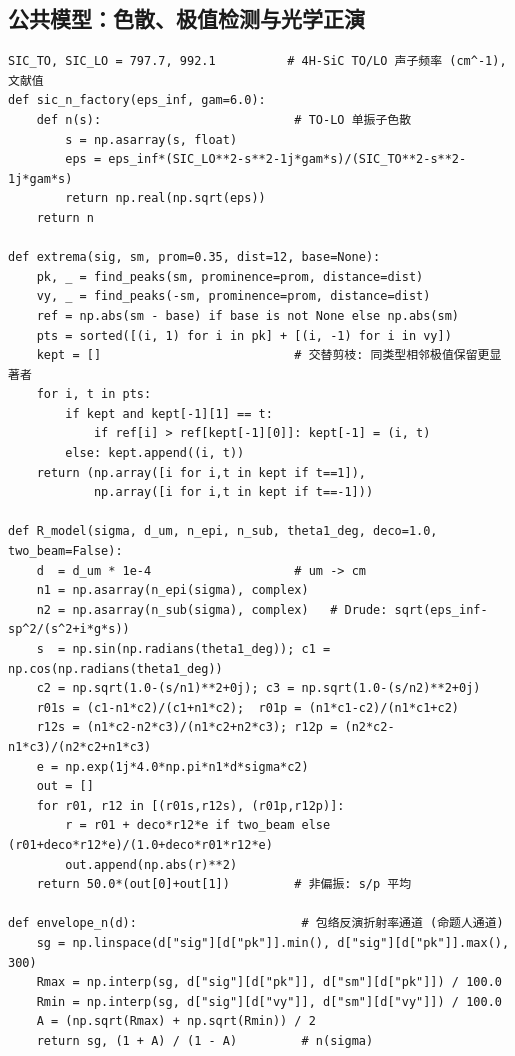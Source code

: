 \documentclass[11pt,a4paper,fontset=fandol]{ctexart}
\begin{document}
\subsection{公共模型：色散、极值检测与光学正演}
\begin{lstlisting}
SIC_TO, SIC_LO = 797.7, 992.1          # 4H-SiC TO/LO 声子频率 (cm^-1), 文献值
def sic_n_factory(eps_inf, gam=6.0):
    def n(s):                           # TO-LO 单振子色散
        s = np.asarray(s, float)
        eps = eps_inf*(SIC_LO**2-s**2-1j*gam*s)/(SIC_TO**2-s**2-1j*gam*s)
        return np.real(np.sqrt(eps))
    return n

def extrema(sig, sm, prom=0.35, dist=12, base=None):
    pk, _ = find_peaks(sm, prominence=prom, distance=dist)
    vy, _ = find_peaks(-sm, prominence=prom, distance=dist)
    ref = np.abs(sm - base) if base is not None else np.abs(sm)
    pts = sorted([(i, 1) for i in pk] + [(i, -1) for i in vy])
    kept = []                           # 交替剪枝: 同类型相邻极值保留更显著者
    for i, t in pts:
        if kept and kept[-1][1] == t:
            if ref[i] > ref[kept[-1][0]]: kept[-1] = (i, t)
        else: kept.append((i, t))
    return (np.array([i for i,t in kept if t==1]),
            np.array([i for i,t in kept if t==-1]))

def R_model(sigma, d_um, n_epi, n_sub, theta1_deg, deco=1.0, two_beam=False):
    d  = d_um * 1e-4                    # um -> cm
    n1 = np.asarray(n_epi(sigma), complex)
    n2 = np.asarray(n_sub(sigma), complex)   # Drude: sqrt(eps_inf-sp^2/(s^2+i*g*s))
    s  = np.sin(np.radians(theta1_deg)); c1 = np.cos(np.radians(theta1_deg))
    c2 = np.sqrt(1.0-(s/n1)**2+0j); c3 = np.sqrt(1.0-(s/n2)**2+0j)
    r01s = (c1-n1*c2)/(c1+n1*c2);  r01p = (n1*c1-c2)/(n1*c1+c2)
    r12s = (n1*c2-n2*c3)/(n1*c2+n2*c3); r12p = (n2*c2-n1*c3)/(n2*c2+n1*c3)
    e = np.exp(1j*4.0*np.pi*n1*d*sigma*c2)
    out = []
    for r01, r12 in [(r01s,r12s), (r01p,r12p)]:
        r = r01 + deco*r12*e if two_beam else (r01+deco*r12*e)/(1.0+deco*r01*r12*e)
        out.append(np.abs(r)**2)
    return 50.0*(out[0]+out[1])         # 非偏振: s/p 平均

def envelope_n(d):                       # 包络反演折射率通道 (命题人通道)
    sg = np.linspace(d["sig"][d["pk"]].min(), d["sig"][d["pk"]].max(), 300)
    Rmax = np.interp(sg, d["sig"][d["pk"]], d["sm"][d["pk"]]) / 100.0
    Rmin = np.interp(sg, d["sig"][d["vy"]], d["sm"][d["vy"]]) / 100.0
    A = (np.sqrt(Rmax) + np.sqrt(Rmin)) / 2
    return sg, (1 + A) / (1 - A)         # n(sigma)
\end{lstlisting}
\end{document}
